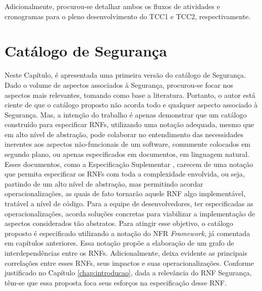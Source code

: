 Adicionalmente, procurou-se detalhar ambos os fluxos de atividades e cronogramas para o pleno desenvolvimento do TCC1 e TCC2, respectivamente.

\chapter{Catálogo de Segurança}
\label{chap:proposta}

Neste Capítulo, é apresentada uma primeira versão do catálogo de Segurança. Dado o volume de aspectos associados à Segurança, procurou-se focar nos aspectos mais relevantes, tomando como base a literatura. Portanto, o autor está ciente de que o catálogo proposto não acorda todo e qualquer aspecto associado à Segurança. Mas, a intenção do trabalho é apenas demonstrar que um catálogo construído para especificar RNFs, utilizando uma notação adequada, mesmo que em alto nível de abstração, pode colaborar no entendimento das necessidades inerentes aos aspectos não-funcionais de um software, comumente colocados em segundo plano, ou apenas especificados em documentos, em linguagem natural. Esses documentos, como a Especificação Suplementar \cite{sommerville1997requirements}, carecem de uma notação que permita especificar os RNFs com toda a complexidade envolvida, ou seja, partindo de  um alto nível de abstração, mas permitindo acordar operacionalizações, as quais de fato tornarão aquele RNF algo implementável, tratável a nível de código. Para a equipe de desenvolvedores, ter especificadas as operacionalizações, acorda soluções concretas para viabilizar a implementação de aspectos considerados tão abstratos. Para atingir esse objetivo, o catálogo proposto é especificado utilizando a notação do NFR \textit{Framework}, já comentada em capítulos anteriores. Essa notação propõe a elaboração de um grafo de interdependências entre os RNFs. Adicionalmente, deixa evidente as principais correlações entre esses RNFs, seus impactos e suas operacionalizações. Conforme justificado no Capítulo \ref{chap:introducao}, dada a relevância do RNF Segurança, têm-se que essa proposta foca seus esforços na especificação desse RNF.


